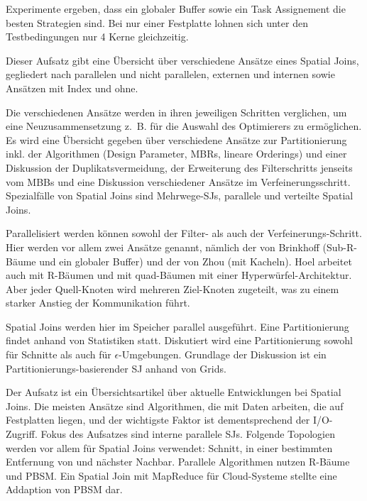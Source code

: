 \documentclass[a4paper,12pt,twoside]{article}
\begin{document}
Experimente ergeben, dass ein globaler Buffer sowie ein Task Assignement die besten Strategien sind. Bei nur einer Festplatte lohnen sich unter den Testbedingungen nur 4 Kerne gleichzeitig. 

\textbf{}

Dieser Aufsatz gibt eine Übersicht über verschiedene Ansätze eines Spatial Joins, gegliedert nach parallelen und nicht parallelen, externen und internen sowie Ansätzen mit Index und ohne.

Die verschiedenen Ansätze werden in ihren jeweiligen Schritten verglichen, um eine Neuzusammensetzung z.~B. für die Auswahl des Optimierers zu ermöglichen. Es wird eine Übersicht gegeben über verschiedene Ansätze zur Partitionierung inkl. der Algorithmen (Design Parameter, MBRs, lineare Orderings) und einer Diskussion der Duplikatsvermeidung, der Erweiterung des Filterschritts jenseits vom MBBs und eine Diskussion verschiedener Ansätze im Verfeinerungsschritt. Spezialfälle von Spatial Joins sind Mehrwege-SJs, parallele und verteilte Spatial Joins.

Parallelisiert werden können sowohl der Filter- als auch der Verfeinerungs-Schritt. Hier werden vor allem zwei Ansätze genannt, nämlich der von Brinkhoff (Sub-R-Bäume und ein globaler Buffer) und der von Zhou (mit Kacheln). Hoel arbeitet auch mit R-Bäumen und mit quad-Bäumen mit einer Hyperwürfel-Architektur. Aber jeder Quell-Knoten wird mehreren Ziel-Knoten zugeteilt, was zu einem starker Anstieg der Kommunikation führt.

\textbf{}

Spatial Joins werden hier im Speicher parallel ausgeführt. Eine Partitionierung findet anhand von Statistiken statt. Diskutiert wird eine Partitionierung sowohl für Schnitte als auch für $\epsilon$-Umgebungen. Grundlage der Diskussion ist ein Partitionierungs-basierender SJ anhand von Grids. 

\textbf{}

Der Aufsatz ist ein Übersichtsartikel über aktuelle Entwicklungen bei Spatial Joins. Die meisten Ansätze sind Algorithmen, die mit Daten arbeiten, die auf Festplatten liegen, und der wichtigste Faktor ist dementsprechend der I/O-Zugriff. Fokus des Aufsatzes sind interne parallele SJs. Folgende Topologien werden vor allem für Spatial Joins verwendet: Schnitt, in einer bestimmten Entfernung von und nächster Nachbar. Parallele Algorithmen nutzen R-Bäume und PBSM. Ein Spatial Join mit MapReduce für Cloud-Systeme stellte eine Addaption von PBSM dar. 
\end{document}
